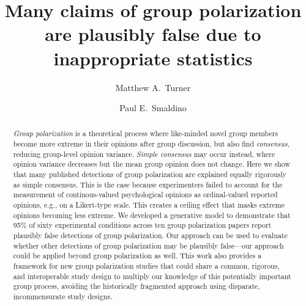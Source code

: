 \documentclass[11pt, letterpaper]{article}
\begin{document}
\title{Many claims of group polarization are plausibly false due to inappropriate
    statistics}
\author[1]{{Matthew A.~Turner}}

\author[2,3]{{Paul E.~Smaldino}}



\maketitle


\linenumbers

\begin{abstract}
  \noindent
  \emph{Group polarization} is a theoretical process where like-minded novel group members 
  become more extreme in their opinions after group discussion, but also find \emph{consensus}, reducing 
  group-level opinion variance.
  \emph{Simple consensus} may occur instead, where opinion variance decreases but
  the mean group opinion does not change.
  Here we show that many published detections of group polarization are explained
  equally rigorously as simple consensus.
  This is the case because experimenters failed
  to account for the measurement of continous-valued psychological opinions 
  as ordinal-valued reported opinions, e.g., on a Likert-type scale. 
  This creates a ceiling effect that masks extreme opinions becoming less extreme.
  We developed a generative model to 
  demonstrate that 95\% of sixty experimental conditions
  across ten group polarization papers report plausibly false detections of
  group polarization. Our approach can be used to evaluate whether other detections of
  group polarization may be plausibly false---our approach could be applied beyond
  group polarization as well. This work also provides a
  framework for new group polarization studies that could
  share a common, rigorous, and interoperable study design to multiply our knowledge
  of this potentially important group process, avoiding the historically fragmented
  approach using disparate, incommensurate study designs.
\end{abstract}
\end{document}
